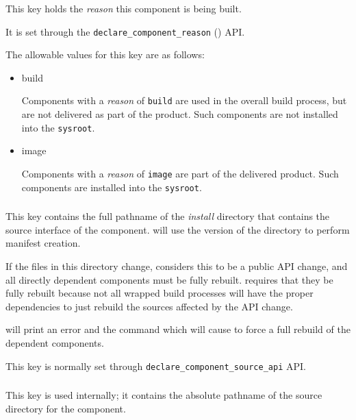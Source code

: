 This key holds the \emph{reason} this component is being built.

It is set through the \texttt{declare\_component\_reason}
() API.

The allowable values for this key are as follows:

\begin{itemize}
\item build

  Components with a \emph{reason} of \texttt{build} are used in the
  overall build process, but are not delivered as part of the product.
  Such components are not installed into the \texttt{sysroot}.

\item image

  Components with a \emph{reason} of \texttt{image} are part of the
  delivered product.  Such components are installed into the
  \texttt{sysroot}.

\end{itemize}
\subsubsection{}\label{lmsbwcomponent:souce-api}

This key contains the full pathname of the \emph{install} directory
that contains the source interface of the component.  \lmsbw will use
the \destdir version of the directory to perform \mtree manifest
creation.

If the files in this directory change, \lmsbw considers this to be a
public API change, and all directly dependent components must be fully
rebuilt.  \lmsbw requires that they be fully rebuilt because not all
wrapped build processes will have the proper dependencies to just
rebuild the sources affected by the API change.

\lmsbw will print an error and the command which will cause \lmsbw to
force a full rebuild of the dependent components.

This key is normally set through
\texttt{declare\_component\_source\_api} API.


\subsubsection{}
This key is used internally; it contains the absolute pathname of the
source directory for the component.

